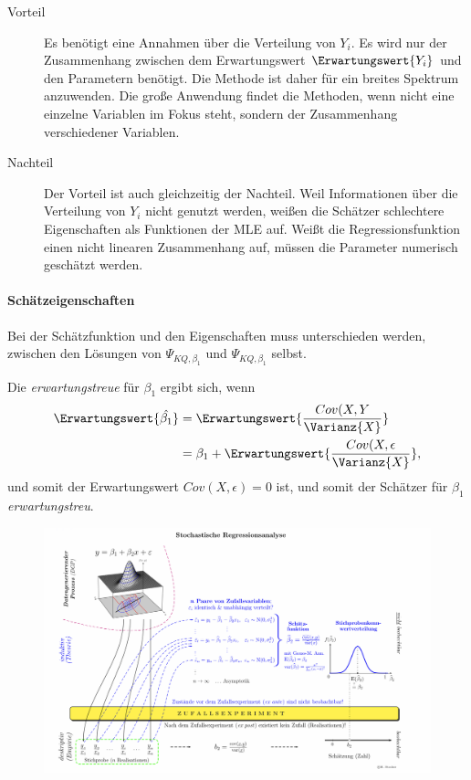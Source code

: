 \begin{description}
	\item[Vorteil] Es benötigt eine Annahmen über die Verteilung von $Y_i$. Es wird nur der Zusammenhang zwischen dem Erwartungswert $\Erwartungswert{Y_i}$ und den Parametern benötigt. Die Methode ist daher für ein breites Spektrum anzuwenden. Die große Anwendung findet die Methoden, wenn nicht eine einzelne Variablen im Fokus steht, sondern der Zusammenhang verschiedener Variablen.
	\item[Nachteil] Der Vorteil ist auch gleichzeitig der Nachteil. Weil Informationen über die Verteilung von $Y_i$ nicht genutzt werden, weißen die Schätzer schlechtere Eigenschaften als Funktionen der \gls{MLE} auf. Weißt die Regressionsfunktion einen nicht linearen Zusammenhang auf, müssen die Parameter numerisch geschätzt werden.
\end{description}

\paragraph{Schätzeigenschaften}

Bei der Schätzfunktion und den Eigenschaften muss unterschieden werden, zwischen den Lösungen von $\Psi_{KQ,\beta_1}$ und $\Psi_{KQ,\beta_1}$ selbst.

Die \textit{erwartungstreue} für $\beta_1$ ergibt sich, wenn
\begin{align}
	\Erwartungswert{\hat{\beta_1}} &= \Erwartungswert{\frac{Cov(X,Y}{\Varianz{X}}}\\
	&=\beta_1 + \Erwartungswert{\frac{Cov(X,\epsilon}{\Varianz{X}}},
\end{align}
und somit der Erwartungswert $Cov(X,\epsilon)=0$ ist, und somit der Schätzer für $\beta_1$ \textit{erwartungstreu}.

\begin{figure}[H]
	\centering
	\includegraphics[scale = 0.1]{attachment/chapter_13/Scc076} %
\end{figure}


